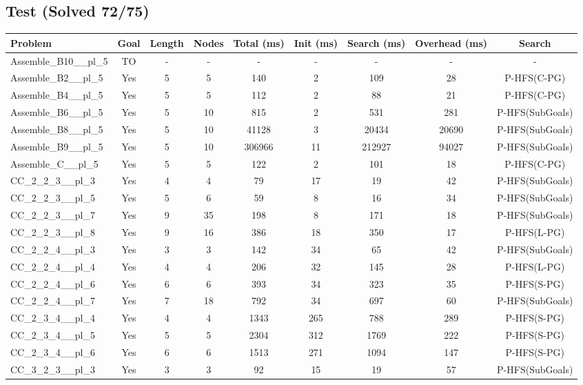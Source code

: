 \documentclass{article}
\begin{document}
\subsection*{Test (Solved 72/75)}
\begin{tabular}{lcccccccc}
\toprule
Problem & Goal & Length & Nodes & Total (ms) & Init (ms) & Search (ms) & Overhead (ms) & Search \\
\midrule
Assemble\_B10\_\_pl\_5 & TO & - & - & - & - & - & - & - \\
Assemble\_B2\_\_pl\_5 & Yes & 5 & 5 & 140 & 2 & 109 & 28 & P-HFS(C-PG) \\
Assemble\_B4\_\_pl\_5 & Yes & 5 & 5 & 112 & 2 & 88 & 21 & P-HFS(C-PG) \\
Assemble\_B6\_\_pl\_5 & Yes & 5 & 10 & 815 & 2 & 531 & 281 & P-HFS(SubGoals) \\
Assemble\_B8\_\_pl\_5 & Yes & 5 & 10 & 41128 & 3 & 20434 & 20690 & P-HFS(SubGoals) \\
Assemble\_B9\_\_pl\_5 & Yes & 5 & 10 & 306966 & 11 & 212927 & 94027 & P-HFS(SubGoals) \\
Assemble\_C\_\_pl\_5 & Yes & 5 & 5 & 122 & 2 & 101 & 18 & P-HFS(C-PG) \\
CC\_2\_2\_3\_\_pl\_3 & Yes & 4 & 4 & 79 & 17 & 19 & 42 & P-HFS(SubGoals) \\
CC\_2\_2\_3\_\_pl\_5 & Yes & 5 & 6 & 59 & 8 & 16 & 34 & P-HFS(SubGoals) \\
CC\_2\_2\_3\_\_pl\_7 & Yes & 9 & 35 & 198 & 8 & 171 & 18 & P-HFS(SubGoals) \\
CC\_2\_2\_3\_\_pl\_8 & Yes & 9 & 16 & 386 & 18 & 350 & 17 & P-HFS(L-PG) \\
CC\_2\_2\_4\_\_pl\_3 & Yes & 3 & 3 & 142 & 34 & 65 & 42 & P-HFS(SubGoals) \\
CC\_2\_2\_4\_\_pl\_4 & Yes & 4 & 4 & 206 & 32 & 145 & 28 & P-HFS(L-PG) \\
CC\_2\_2\_4\_\_pl\_6 & Yes & 6 & 6 & 393 & 34 & 323 & 35 & P-HFS(S-PG) \\
CC\_2\_2\_4\_\_pl\_7 & Yes & 7 & 18 & 792 & 34 & 697 & 60 & P-HFS(SubGoals) \\
CC\_2\_3\_4\_\_pl\_4 & Yes & 4 & 4 & 1343 & 265 & 788 & 289 & P-HFS(S-PG) \\
CC\_2\_3\_4\_\_pl\_5 & Yes & 5 & 5 & 2304 & 312 & 1769 & 222 & P-HFS(S-PG) \\
CC\_2\_3\_4\_\_pl\_6 & Yes & 6 & 6 & 1513 & 271 & 1094 & 147 & P-HFS(S-PG) \\
CC\_3\_2\_3\_\_pl\_3 & Yes & 3 & 3 & 92 & 15 & 19 & 57 & P-HFS(SubGoals) \\

\end{tabular}
\end{document}
